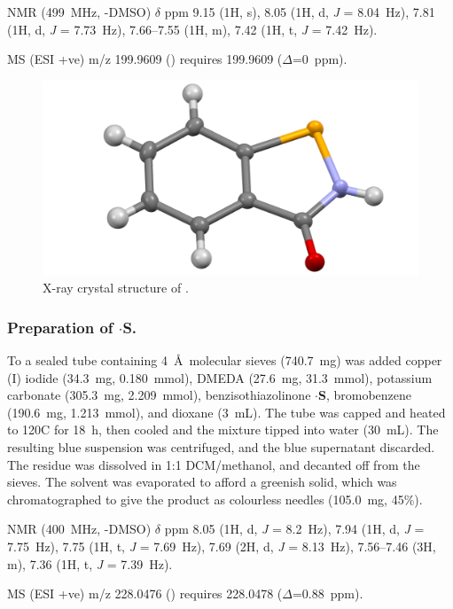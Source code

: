 \begin{refsection}
 NMR (499~MHz, -DMSO) $\delta$ ppm 9.15 (1H, s), 8.05 (1H, d, \emph{J} = 8.04~Hz), 7.81 (1H, d, \emph{J} = 7.73~Hz), 7.66--7.55 (1H, m), 7.42 (1H, t, \emph{J} = 7.42~Hz).

MS (ESI +ve) m/z 199.9609 ()  requires 199.9609 ($\Delta$=0~ppm).

\begin{figure}
    \includegraphics[width=0.8\linewidth]{Figures/ebs-h-xtal.pdf}
    \caption{X-ray crystal structure of .}
\end{figure}

\subsubsection{Preparation of \texorpdfstring{$\cdot$\textbf{S}}{.S}.}
To a sealed tube containing 4~\AA\ molecular sieves (740.7~mg) was added copper (I) iodide (34.3~mg, 0.180~mmol), DMEDA (27.6~mg, 31.3~mmol), potassium carbonate (305.3~mg, 2.209~mmol), benzisothiazolinone $\cdot$\textbf{S}, bromobenzene (190.6~mg, 1.213~mmol), and dioxane (3~mL).
The tube was capped and heated to 120\degree C for 18~h, then cooled and the mixture tipped into water (30~mL). The resulting blue suspension was centrifuged, and the blue supernatant discarded. The residue was dissolved in 1:1 DCM/methanol, and decanted off from the sieves.
The solvent was evaporated to afford a greenish solid, which was chromatographed to give the product as colourless needles (105.0~mg, 45\%).

 NMR (400~MHz, -DMSO) $\delta$ ppm 8.05 (1H, d, \emph{J} = 8.2~Hz), 7.94 (1H, d, \emph{J} = 7.75~Hz), 7.75 (1H, t, \emph{J} = 7.69~Hz), 7.69 (2H, d, \emph{J} = 8.13~Hz), 7.56--7.46 (3H, m), 7.36 (1H, t, \emph{J} = 7.39~Hz).

MS (ESI +ve) m/z 228.0476 ()  requires 228.0478 ($\Delta$=0.88~ppm).


\end{refsection}
